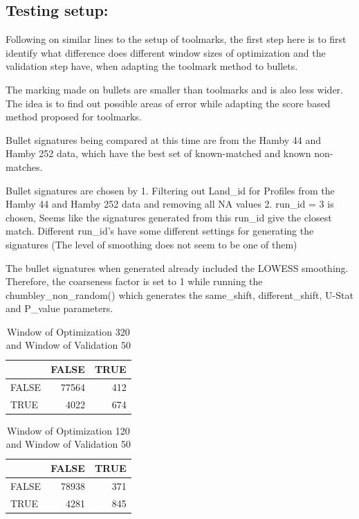\documentclass[12pt]{article}
\begin{document}
\subsection{Testing setup:}\label{testing-setup}


Following on similar lines to the setup of toolmarks, the first step
here is to first identify what difference does different window sizes of
optimization and the validation step have, when adapting the toolmark
method to bullets.

The marking made on bullets are smaller than toolmarks and is also less
wider. The idea is to find out possible areas of error while adapting
the score based method proposed for toolmarks.

Bullet signatures being compared at this time are from the Hamby 44 and
Hamby 252 data, which have the best set of known-matched and known
non-matches.

Bullet signatures are chosen by 1. Filtering out Land\_id for Profiles
from the Hamby 44 and Hamby 252 data and removing all NA values 2.
run\_id = 3 is chosen, Seems like the signatures generated from this
run\_id give the closest match. Different run\_id's have some different
settings for generating the signatures (The level of smoothing does not
seem to be one of them)

The bullet signatures when generated already included the LOWESS
smoothing. Therefore, the coarseness factor is set to 1 while running
the chumbley\_non\_random() which generates the same\_shift,
different\_shift, U-Stat and P\_value parameters.

\begin{table}[!h]

\caption{\label{tab:unnamed-chunk-2}Window of Optimization 320 and Window of Validation 50}
\centering
\begin{tabular}[t]{lrr}
\toprule
  & FALSE & TRUE\\
\midrule
FALSE & 77564 & 412\\
TRUE & 4022 & 674\\
\bottomrule
\end{tabular}
\end{table}

\begin{table}[!h]

\caption{\label{tab:unnamed-chunk-3}Window of Optimization 120 and Window of Validation 50}
\centering
\begin{tabular}[t]{lrr}
\toprule
  & FALSE & TRUE\\
\midrule
FALSE & 78938 & 371\\
TRUE & 4281 & 845\\
\bottomrule
\end{tabular}
\end{table}
\end{document}
